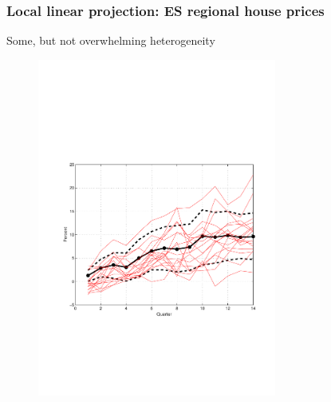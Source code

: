 \documentclass[pdflatex,aspectratio=169]{beamer}
\begin{document}
\begin{frame}\frametitle{\bf Local linear projection:   ES regional house prices \hyperlink{Robust}{} \hypertarget{ESlocalHP}{}}
Some, but not overwhelming heterogeneity
\vspace*{-5mm}
\begin{figure}
\begin{center}
\includegraphics[width=0.7\textwidth]{./figures/fRegHP}\\
\end{center}
\end{figure}

\end{frame}
\end{document}

